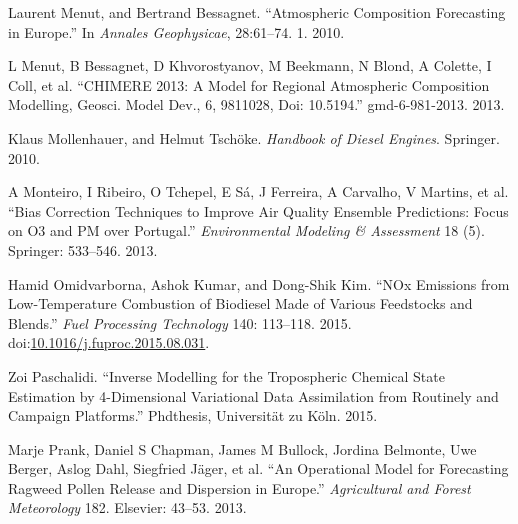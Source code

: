 \documentclass[9pt]{report}
\begin{document}
{\begin{thebibliography}{34}
Laurent Menut, and Bertrand Bessagnet. \textquotedblleft{}Atmospheric Composition Forecasting in Europe.\textquotedblright{} In \emph{Annales Geophysicae}, 28:61–74. 1. 2010.\label{menut2010atmospheric}%

L Menut, B Bessagnet, D Khvorostyanov, M Beekmann, N Blond, A Colette, I Coll, et al. \textquotedblleft{}CHIMERE 2013: A Model for Regional Atmospheric Composition Modelling, Geosci. Model Dev., 6, 981\textendash{}1028, Doi: 10.5194.\textquotedblright{} gmd-6-981-2013. 2013.\label{menut2013chimere}%

Klaus Mollenhauer, and Helmut Tschöke. \emph{Handbook of Diesel Engines}. Springer. 2010.\label{mollenhauer2010handbook}%

A Monteiro, I Ribeiro, O Tchepel, E S\'{a}, J Ferreira, A Carvalho, V Martins, et al. \textquotedblleft{}Bias Correction Techniques to Improve Air Quality Ensemble Predictions: Focus on O3 and PM over Portugal.\textquotedblright{} \emph{Environmental Modeling \& Assessment} 18 (5). Springer: 533–546. 2013.\label{monteiro2013bias}%

Hamid Omidvarborna, Ashok Kumar, and Dong-Shik Kim. \textquotedblleft{}NOx Emissions from Low-Temperature Combustion of Biodiesel Made of Various Feedstocks and Blends.\textquotedblright{} \emph{Fuel Processing Technology} 140: 113–118. 2015. doi:\href{https://dx.doi.org/10.1016/j.fuproc.2015.08.031}{10.1016/j.fuproc.2015.08.031}.\label{omidvarborna2015113}%

Zoi Paschalidi. \textquotedblleft{}Inverse Modelling for the Tropospheric Chemical State Estimation by 4-Dimensional Variational Data Assimilation from Routinely and Campaign Platforms.\textquotedblright{} Phdthesis, Universit\"{a}t zu K\"{o}ln. 2015.\label{paschalidi2015inverse}%

Marje Prank, Daniel S Chapman, James M Bullock, Jordina Belmonte, Uwe Berger, Aslog Dahl, Siegfried J\"{a}ger, et al. \textquotedblleft{}An Operational Model for Forecasting Ragweed Pollen Release and Dispersion in Europe.\textquotedblright{} \emph{Agricultural and Forest Meteorology} 182. Elsevier: 43–53. 2013.\label{prank2013operational}%


\end{thebibliography}}
\end{document}

